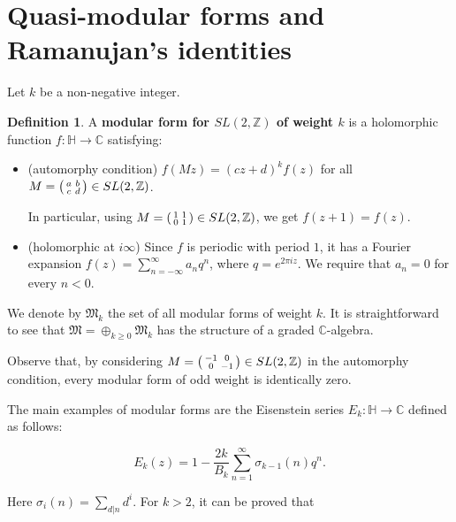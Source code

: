 \documentclass{article}
\numberwithin{equation}{section}
\numberwithin{figure}{section}
\theoremstyle{plain}
\theoremstyle{definition}
\newtheorem{definition}[theorem]{Definition}
\numberwithin{equation}{section}
\newtheorem[S, bodystyle=\normalfont\noindent]{defiS}{Definition}[section]
\begin{document}
\section{Quasi-modular forms and Ramanujan's identities}

Let $k$ be a non-negative integer.

\begin{definition}
A \textbf{modular form for $SL(2,\mathbb{Z})$ of weight $k$} is a holomorphic function $f:\mathbb{H}\rightarrow \mathbb{C}$ satisfying:
\begin{itemize}
\item (automorphy condition) $f(Mz)=(cz+d)^kf(z)$ for all $M=\begin{psmallmatrix}a & b\\c & d\end{psmallmatrix}\in SL(2,\mathbb{Z})$.
    
    
In particular, using $M=\begin{psmallmatrix}1 & 1\\0 & 1\end{psmallmatrix}\in SL(2,\mathbb{Z})$, we get $f(z+1)=f(z)$.
\item (holomorphic at $i\infty$) Since $f$ is periodic with period $1$, it has a Fourier expansion $f(z)=\sum_{n=-\infty}^{\infty} a_n q^n$, where $q=e^{2\pi iz}$. We require that $a_n=0$ for every $n<0$. 
\end{itemize}

\noindent   We denote by $\mathfrak{M}_k$ the set of all modular forms of weight $k$. It is straightforward to see that $\mathfrak{M}=\oplus_{k\geq 0}\mathfrak{M}_k$ has the structure of a graded $\mathbb{C}$-algebra.
\end{definition}

Observe that, by considering $M=\begin{psmallmatrix}-1 & 0\\0 & -1\end{psmallmatrix}\in SL(2,\mathbb{Z})$ in the automorphy condition, every modular form of odd weight is identically zero. 

The main examples of modular forms are the Eisenstein series  $E_k:\mathbb{H}\rightarrow \mathbb{C}$ defined as follows:


\begin{equation}\label{bernoulli}E_{k}(z)=1-\frac{2k}{B_k}\sum_{n=1}^{\infty} \sigma_{k-1}(n)q^n.
\end{equation}

Here $\sigma_i(n)=\sum_{d|n}d^i$.  For $k>2$, it can be proved that \parencite[First lecture notes, \S 2.1]{123}
\end{document}
